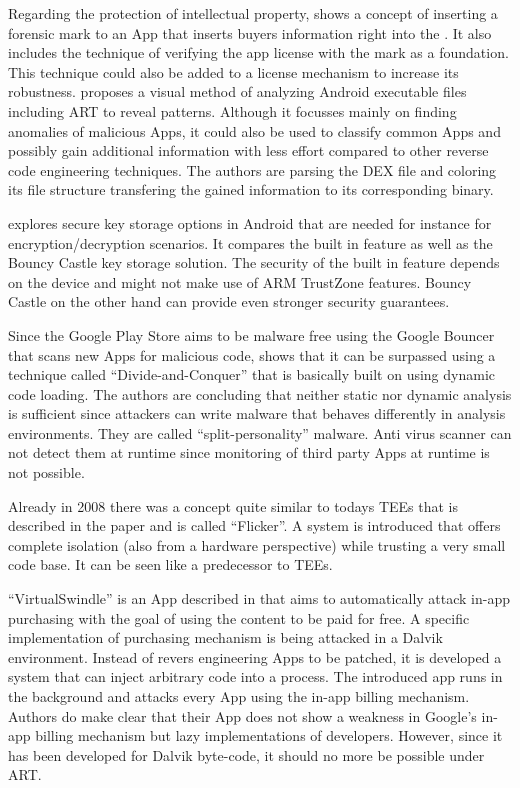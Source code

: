Regarding the protection of intellectual property, \parencite{forensic_mark}
shows a concept of inserting a forensic mark to an App that inserts buyers 
information right into the . It also includes the technique
of verifying the app license with the mark as a foundation. This technique could
also be added to a license mechanism to increase its robustness.
\parencite{visual_exploration} proposes a visual method of analyzing Android
executable files including ART to reveal patterns. Although it focusses mainly
on finding anomalies of malicious Apps, it could also be used to classify 
common Apps and possibly gain additional information with less effort compared
to other reverse code engineering techniques. The authors are parsing the
DEX file and coloring its file structure transfering the gained information
to its corresponding binary. 

\parencite{key_storage} explores secure key storage options in Android that are needed for instance for encryption/decryption scenarios. It compares the built in
feature as well as the Bouncy Castle key storage solution. The security of the 
built in feature depends on the device and might not make use of ARM
TrustZone features. Bouncy Castle on the other hand can provide even stronger 
security guarantees.

Since the Google Play Store aims to be malware free using the Google Bouncer that scans new Apps for malicious code, \parencite{divide_and_conquer}
shows that it can be surpassed using a technique called ``Divide-and-Conquer''
that is basically built on using dynamic code loading. The authors are concluding
that neither static nor dynamic analysis is sufficient since attackers can write
malware that behaves differently in analysis environments. They are called 
``split-personality'' malware. Anti virus scanner can not detect them at runtime
since monitoring of third party Apps at runtime is not possible. 

Already in 2008 there was a concept quite similar to todays TEEs that is described in the paper \parencite{flicker} and is called ``Flicker''.
A system is introduced that offers complete isolation (also from a hardware perspective) while trusting a very small code base. It can be seen like a predecessor to TEEs.

``VirtualSwindle'' is an App described in \parencite{virtualswindle} that
aims to automatically attack in-app purchasing with the goal of using the 
content to be paid for free. A specific implementation of purchasing mechanism
is being attacked in a Dalvik environment. Instead of revers engineering Apps to be patched, it is developed a system that can inject arbitrary code into a process. The introduced app runs in the background and attacks every App using
the in-app billing mechanism. Authors do make clear that their App does not show
a weakness in Google's in-app billing mechanism but lazy implementations of developers. However, since it has been developed for Dalvik byte-code, it should no more be possible under ART. 

